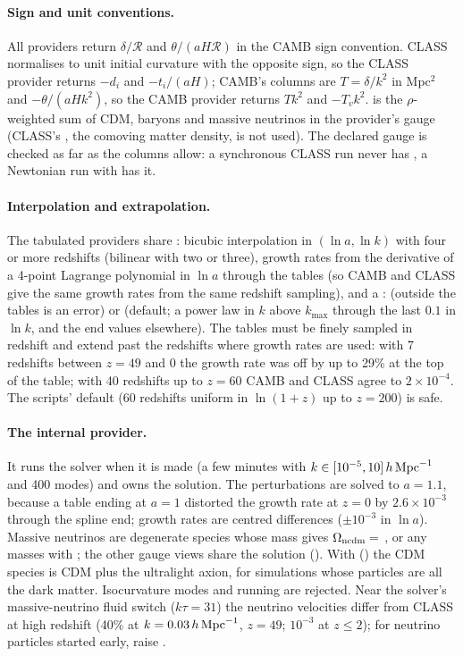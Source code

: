 \paragraph*{Sign and unit conventions.} All providers return $\delta/\mathcal R$ and $\theta/(aH\mathcal R)$ in the CAMB
sign convention. CLASS normalises to unit initial curvature with the opposite sign, so the CLASS provider returns
$-d_i$ and $-t_i/(aH)$; CAMB's columns are $T=\delta/k^2$ in Mpc$^2$ and $-\theta/(aHk^2)$, so the CAMB provider
returns $Tk^2$ and $-T_vk^2$.  is the $\rho$-weighted sum of CDM, baryons and massive neutrinos in the
provider's gauge (CLASS's , the comoving matter density, is not used). The declared gauge is checked as far
as the columns allow: a synchronous CLASS run never has , a Newtonian run with  has it.

\paragraph*{Interpolation and extrapolation.} The tabulated providers share :
bicubic interpolation in $(\ln a,\ln k)$ with four or more redshifts (bilinear with two or three), growth rates from
the derivative of a 4-point Lagrange polynomial in $\ln a$ through the tables (so CAMB and CLASS give the same growth
rates from the same redshift sampling), and a :  (outside the tables is an error) or
 (default; a power law in $k$ above $k_{\max}$ through the last $0.1$ in $\ln k$, and the end
values elsewhere). The tables must be finely sampled in redshift and extend past the redshifts where growth rates are
used: with 7 redshifts between $z=49$ and 0 the growth rate was off by up to 29\% at the top of the table; with 40
redshifts up to $z=60$ CAMB and CLASS agree to $2\times10^{-4}$. The scripts' default (60 redshifts uniform in
$\ln(1+z)$ up to $z=200$) is safe.

\paragraph*{The internal provider.} It runs the solver when it is made (a few minutes with $k\in[10^{-5},10]\,h\,\mathrm{Mpc}^{-1}$ and
400 modes) and owns the solution. The perturbations are solved to $a=1.1$, because a table ending at $a=1$ distorted
the growth rate at $z=0$ by $2.6\times10^{-3}$ through the spline end; growth rates are centred differences
($\pm10^{-3}$ in $\ln a$). Massive neutrinos are  degenerate species whose mass gives
$\Omega_{\rm ncdm}=$ , or any masses with ; the other gauge views share the solution
(). With  () the CDM species is CDM plus the
ultralight axion, for simulations whose particles are all the dark matter. Isocurvature modes and running are
rejected. Near the solver's massive-neutrino fluid switch ($k\tau=31$) the neutrino velocities differ from CLASS at
high redshift (40\% at $k=0.03\,h\,\mathrm{Mpc}^{-1}$, $z=49$; $10^{-3}$ at $z\le2$); for neutrino particles started early, raise
.

